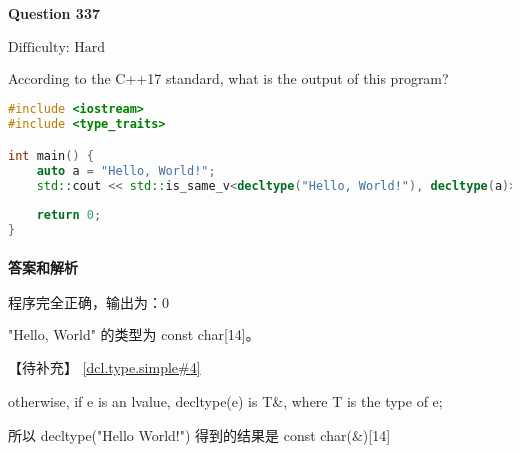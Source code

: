 \documentclass{article}
\begin{document}
	
	\paragraph*{Question 337} $\boxed{\text{Difficulty: Hard}} $			
	
	According to the C++17 standard, what is the output of this program?
	
	\begin{lstlisting}[language=C++]  		
#include <iostream>
#include <type_traits>

int main() {
	auto a = "Hello, World!";
	std::cout << std::is_same_v<decltype("Hello, World!"), decltype(a)>;
	
	return 0;
}
	\end{lstlisting}
	
	
	\paragraph*{答案和解析} $\boxed{\text{程序完全正确，输出为：0}} $
	
	"Hello, World" 的类型为 const char[14]。
	
	【待补充】
	\href{https://timsong-cpp.github.io/cppwp/n4659/dcl.type.simple#4}{[dcl.type.simple\#4]}
	
	\begin{lightgrayleftbar}
		otherwise, if e is an lvalue, decltype(e) is T\&, where T is the type of e;
	\end{lightgrayleftbar}
	
	所以 decltype("Hello World!") 得到的结果是 const char(\&)[14]
	
\end{document}
